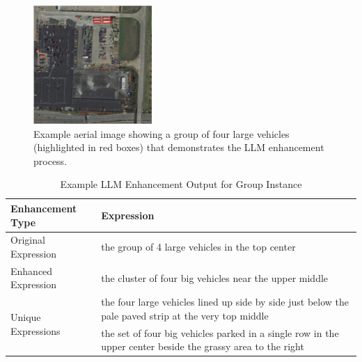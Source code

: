 \begin{figure}[H]
\centering
\includegraphics[width=0.4\textwidth]{example_group.png}
\caption{Example aerial image showing a group of four large vehicles (highlighted in red boxes) that demonstrates the LLM enhancement process.}
\label{fig:llm_enhancement_example}
\end{figure}

\begin{table}[H]
\centering
\caption{Example LLM Enhancement Output for Group Instance}
\label{tab:llm_enhancement_example}
\begin{tabular}{@{}p{}p{}@{}}
\toprule
\textbf{Enhancement Type} & \textbf{Expression} \\
\midrule
Original Expression & the group of 4 large vehicles in the top center \\
\midrule
Enhanced Expression & the cluster of four big vehicles near the upper middle \\
\midrule
\multirow{2}{0.25\textwidth}{Unique Expressions} & the four large vehicles lined up side by side just below the pale paved strip at the very top middle \\
\cmidrule(l){2-2}
& the set of four big vehicles parked in a single row in the upper center beside the grassy area to the right \\
\bottomrule
\end{tabular}
\end{table}


